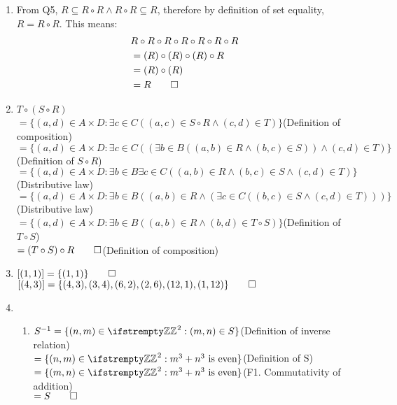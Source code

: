 \documentclass[12pt, a4paper]{article}
\begin{document}
\begin{enumerate}[Q\arabic*.]
  \item From Q5, $R \subseteq R\circ R \land R\circ R \subseteq R$, therefore by definition of set equality, $R = R\circ R$. This means:
    \begin{align*}
      &R \circ R \circ R \circ R \circ R \circ R \circ R \\
      &= (R) \circ (R) \circ (R) \circ R \\
      &= (R) \circ (R)\\
      &= R \qed
    \end{align*}

  \item $T \circ (S \circ R)$\\
    $= \{(a,d) \in A\times D : \exists c \in C ((a, c) \in S\circ R \land (c, d) \in T)\}$\hfill(Definition of composition)
    $= \{(a,d) \in A\times D : \exists c \in C ((\exists b \in B ((a, b) \in R \land (b, c) \in S)) \land (c, d) \in T)\}$\hfill(Definition of $S\circ R$)
    $= \{(a,d) \in A\times D : \exists b \in B\exists c \in C ((a, b) \in R \land (b, c) \in S \land (c, d) \in T)\}$\hfill(Distributive law)
    $= \{(a,d) \in A\times D : \exists b \in B((a, b) \in R \land (\exists c \in C((b, c) \in S \land (c, d) \in T)))\}$\hfill(Distributive law)
    $= \{(a,d) \in A\times D : \exists b \in B((a, b) \in R \land (b, d) \in T \circ S)\}$\hfill(Definition of $T \circ S$)\\
   $= (T \circ S) \circ R \qed$\hfill(Definition of composition) 

  \item $[(1, 1)] = \{(1, 1)\} \qed$\\
    $[(4, 3)] = \{(4, 3), (3, 4), (6, 2), (2, 6), (12, 1), (1, 12)\} \qed$

  \item 
    \begin{enumerate}[(\alph*)]
      \item $S^{-1} = \{(n, m) \in \ZZ^2: (m, n) \in S\}$\hfill(Definition of inverse relation)\\
        $= \{(n, m) \in \ZZ^2: m^3 + n^3\text{ is even}\}$\hfill(Definition of S)\\
        $= \{(m, n) \in \ZZ^2: m^3 + n^3\text{ is even}\}$\hfill(F1. Commutativity of addition)\\
        $= S\qed$


\end{enumerate}
\end{enumerate}
\end{document}
